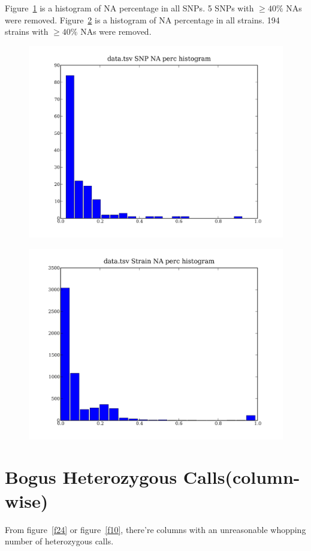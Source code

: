 \documentclass[a4paper,10pt]{article}
\begin{document}
Figure~\ref{f4} is a histogram of NA percentage in all SNPs. 5 SNPs with $\geq 40\%$ NAs were removed. Figure~\ref{f5} is a histogram of NA percentage in all strains. 194 strains with $\geq 40\%$ NAs were removed.

\begin{figure}
\includegraphics[width=1\textwidth]{figures/data_SNP_NA_perc.png}
\caption{}\label{f4}
\end{figure}

\begin{figure}
\includegraphics[width=1\textwidth]{figures/data_strain_NA_perc.png}
\caption{}\label{f5}
\end{figure}


\section{Bogus Heterozygous Calls(column-wise)}
From figure~\ref{f24} or figure~\ref{f10}, there're columns with an unreasonable whopping number of heterozygous calls.
\end{document}
